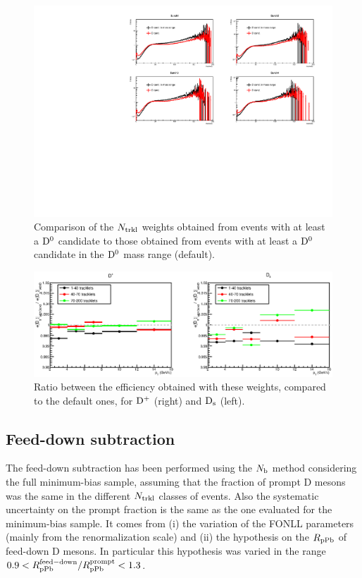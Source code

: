 \begin{figure}[htpb]
\centering
 \includegraphics[width=.9\textwidth]{FigCap6/NtrkWeightsD-Cand_4Bunches_DsDplusVsmult.pdf}
 \caption{Comparison of the $N_{\rm trkl}$ weights obtained from events with at least a ${\rm D^0}$ candidate to those obtained from events with at least a ${\rm D^0}$ candidate in the ${\rm D^0}$ mass range (default).}
 \label{fig:NtrklWeights_EvWithD_EvWithCand_Comparison}
\end{figure}


\begin{figure}[htpb]
\centering
 \includegraphics[width=.9\textwidth]{FigCap6/SystOnDWeightsWithCandVsWithD.eps}
 \caption{Ratio between the efficiency obtained with these weights, compared to the default ones, for ${\rm D^+}$ (right) and ${\rm D_s}$ (left).}
 \label{fig:DsDplusVsMult_SystEffWeights}
\end{figure}

\subsection{Feed-down subtraction}
\label{sec:FDsyst}
The feed-down subtraction has been performed using the $N_{\rm b}$ 
method considering the full minimum-bias sample, assuming that the 
fraction of prompt D mesons was the same in the different $N_{\rm trkl}$ 
classes of events. Also the systematic uncertainty on the prompt 
fraction is the same as the one evaluated for the minimum-bias sample. 
It comes from (i) the variation of the FONLL parameters (mainly from the 
renormalization scale) and (ii) the hypothesis on the $R_{\rm pPb}$ of feed-down
 D mesons. In particular this hypothesis was varied in the range 
 $0.9 <R_{\rm pPb}^{\rm feed-down}/R_{\rm pPb}^{\rm prompt} < 1.3$.

